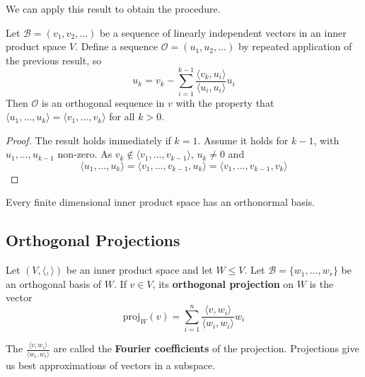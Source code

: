 We can apply this result to obtain the procedure.

\begin{theorem} 
    Let $\mathcal{B} = (v_1,v_2,...)$ be a sequence of linearly independent vectors in an inner product space $V$. Define a sequence $\mathcal{O} = (u_1,u_2,...)$ by repeated application of the previous result, so \begin{equation*}
        u_k = v_k - \sum_{i=1}^{k-1}\frac{\langle v_k,u_i\rangle}{\langle u_i,u_i\rangle}u_i
    \end{equation*}
    Then $\mathcal{O}$ is an orthogonal sequence in $v$ with the property that $\langle u_1,...,u_k\rangle = \langle v_1,...,v_k\rangle$ for all $k > 0$.
\end{theorem}
\begin{proof}
    The result holds immediately if $k = 1$. Assume it holds for $k-1$, with $u_1,...,u_{k-1}$ non-zero. As $v_k \notin \langle v_1,...,v_{k-1}\rangle$, $u_k \neq 0$ and \begin{equation*}
        \langle u_1,...,u_k\rangle = \langle v_1,...,v_{k-1},u_k\rangle = \langle v_1,...,v_{k-1},v_k\rangle
    \end{equation*}
\end{proof}

\begin{corollary}
    Every finite dimensional inner product space has an orthonormal basis.
\end{corollary}

\subsection{Orthogonal Projections}

\begin{definition}
    Let $(V,\langle,\rangle)$ be an inner product space and let $W \leq V$. Let $\mathcal{B} = \{w_1,...,w_r\}$ be an orthogonal basis of $W$. If $v \in V$, its \textbf{orthogonal projection} on $W$ is the vector \begin{equation*}
        \text{proj}_W(v) = \sum_{i=1}^n\frac{\langle v,w_i\rangle}{\langle w_i,w_i\rangle}w_i
    \end{equation*}
\end{definition}

The $\frac{\langle v,w_i\rangle}{\langle w_i,w_i\rangle}$ are called the \textbf{Fourier coefficients} of the projection. Projections give us best approximations of vectors in a subspace.

